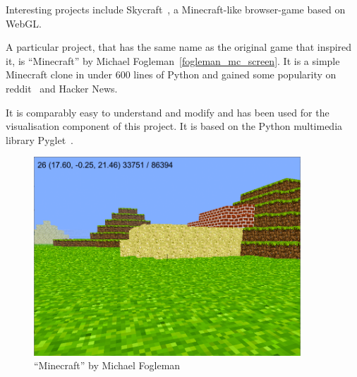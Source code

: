 Interesting projects include Skycraft~\cite{skycraft}, a Minecraft-like browser-game based on WebGL.

A particular project, that has the same name as the original game that inspired it, is ``Minecraft'' by Michael Fogleman~\ref{fogleman_mc_screen}. It is a simple Minecraft clone in under 600 lines of Python and gained some popularity on reddit~\cite{fogle-reddit} and Hacker News.~\cite{fogle_hn}

It is comparably easy to understand and modify and has been used for the visualisation component of this project. It is based on the Python multimedia library Pyglet~\cite{pyglet}.

\begin{figure}[h]
  \centering
    \includegraphics[width=10cm]{graphics/fogleman_mc_screen}
  \caption{``Minecraft'' by Michael Fogleman}
  \label{psi_screen}
\end{figure}
